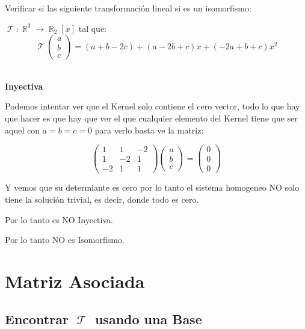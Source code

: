 \documentclass[12pt]{report}                                    %
\DeclareMathOperator \Real {\mathbb{R}}                         %
\DeclareMathOperator \LinealTransformation {\mathcal{T}}        %
\DeclareMathOperator \LT {\mathcal{T}}                          %
\newcommand{\pVector}[1]{                                       %
        \ensuremath{\begin{pmatrix}#1\end{pmatrix}}                 %
    }
\begin{document}
            Verificar si las siguiente transformación lineal si es un isomorfismo:

            $\LinealTransformation : \Real^3 \to \Real_2[x]$ tal que: 
            \begin{equation*}
                \LinealTransformation \pVector{a\\b\\c}= (a+b-2c)+(a-2b+c)x+(-2a+b+c)x^2
            \end{equation*}


            \textbf{\\Inyectiva}

            Podemos intentar ver que el Kernel solo contiene el cero vector, todo lo que hay que hacer es
            que hay que ver el que cualquier elemento del Kernel tiene que ser aquel con $a=b=c=0$
            para verlo basta ve la matriz:

            \begin{equation*}
                \pVector{1&1&-2\\1&-2&1\\-2&1&1} \pVector{a\\b\\c} = \pVector{0\\0\\0}
            \end{equation*}
            

            Y vemos que su determiante es cero por lo tanto el sistema homogeneo NO solo
            tiene la solución trivial, es decir, donde todo es cero.

            Por lo tanto es NO Inyectiva.

            Por lo tanto NO es Isomorfismo.




\chapter{Matriz Asociada}

    \clearpage
    \section{Encontrar $\LT$ usando una Base}
\end{document}
